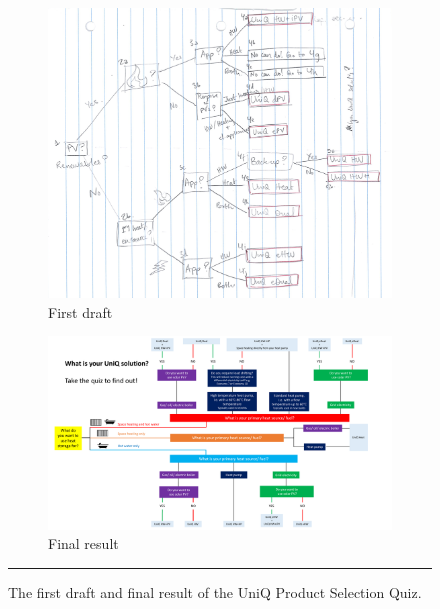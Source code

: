 \begin{figure}[htbp]
    \centering
        \begin{subfigure}{.38\textwidth}
          \centering
          \includegraphics[width=\textwidth]{figures/QuizSketch.png}
          \caption{First draft}
          \label{fig:quiz_draft}
        \end{subfigure}
        \begin{subfigure}{.58\textwidth}
          \centering
          \includegraphics[width=\textwidth]{Appendices/final_quiz.pdf}
          \caption{Final result}
          \label{fig:quiz_final}
        \end{subfigure}
    \rule{\textwidth}{0.5pt} %
    \caption{The first draft and final result of the UniQ Product Selection Quiz.}
    \label{fig:quiz}
\end{figure}



